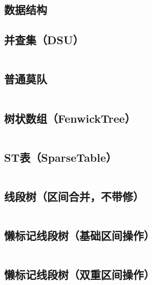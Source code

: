 \documentclass[a4paper]{article}
\begin{document}
\begin{multicols}{2}
\begin{spacing}{0.6}

\section{数据结构}

\subsection{并查集（DSU）}
\inputminted{cpp}{\detokenize{Template/数据结构/01 - 并查集（DSU）.txt}}

\subsection{普通莫队}
\inputminted{cpp}{\detokenize{Template/数据结构/02 - 普通莫队.txt}}

\subsection{树状数组（FenwickTree）}
\inputminted{cpp}{\detokenize{Template/数据结构/03 - 树状数组（FenwickTree）.txt}}
\columnbreak

\subsection{ST表（SparseTable）}
\inputminted{cpp}{\detokenize{Template/数据结构/04 - ST表（SparseTable）.txt}}
\columnbreak

\subsection{线段树（区间合并，不带修）}
\inputminted{cpp}{\detokenize{Template/数据结构/05 - 线段树（区间合并，不带修）.txt}}
\columnbreak

\subsection{懒标记线段树（基础区间操作）}
\inputminted{cpp}{\detokenize{Template/数据结构/06A - 懒标记线段树（基础区间操作）.txt}}
\columnbreak

\subsection{懒标记线段树（双重区间操作）}
\inputminted{cpp}{\detokenize{Template/数据结构/06B - 懒标记线段树（双重区间操作）.txt}}
\columnbreak


\end{spacing}
\end{multicols}
\end{document}
